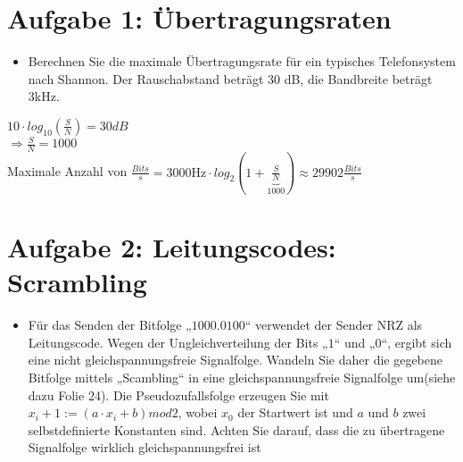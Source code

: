 \section{Aufgabe 1: Übertragungsraten}
	\begin{itemize}
		\item Berechnen Sie die maximale Übertragungsrate für ein typisches Telefonsystem nach Shannon. Der Rauschabstand beträgt 30 dB, die Bandbreite beträgt 3kHz.
	\end{itemize}
	$10 \cdot log_{10}(\frac{S}{N})=30 dB$
	\\ $\Rightarrow \frac{S}{N} = 1000$
	\\Maximale Anzahl von $\frac{Bits}{s} =3000\text{Hz} \cdot log_{2}(1+\underbrace{\frac{S}{N}}_\text{1000})  \approx 29902 \frac{Bits}{s}$


\section{Aufgabe 2: Leitungscodes: Scrambling}
	\begin{itemize}
		\item Für das Senden der Bitfolge „$1000.0100$“ verwendet der Sender NRZ als Leitungscode. Wegen der Ungleichverteilung der Bits „$1$“ und „$0$“, ergibt sich eine nicht gleichspannungsfreie Signalfolge.
		Wandeln Sie daher die gegebene Bitfolge mittels „Scambling“ in eine gleichspannungsfreie Signalfolge um(siehe dazu Folie 24).
		Die Pseudozufallsfolge erzeugen Sie mit $x_{i}+1 := (a \cdot x_i+ b) mod 2$, wobei $x_0$ der Startwert ist und $a$ und $b$ zwei selbstdefinierte Konstanten sind. 
		Achten Sie darauf, dass die zu übertragene Signalfolge wirklich gleichspannungsfrei ist
	\end{itemize}
